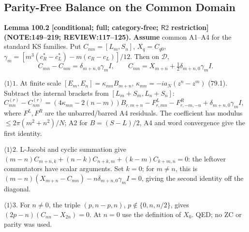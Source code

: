 \subsection{Parity-Free Balance on the Common Domain}

\textbf{Lemma 100.2 [conditional; full; category-free; \(\mathsf R2\) restriction] (NOTE:149--219; REVIEW:117--125).}
\textbf{Assume} common A1--A4 for the standard KS families. Put \(C_{mn}=[L_m,S_n]\), \(X_q=C_{q0}\),
\(\gamma_m=[m^3(c_R^*-c_L^*)-m(c_R-c_L)]/12\). Then on \(\mathcal D\),
\begin{equation}\label{eq:100-mixed}
 C_{mn}-C_{nm}=\delta_{m+n,0}\gamma_m I,\qquad
 C_{mn}=X_{m+n}+\tfrac12\delta_{m+n,0}\gamma_m I. 
\end{equation}
\par\(\langle1\rangle1\). At finite scale \([E_m,E_n]=\kappa_{mn}B_{m+n}\),
\(\kappa_{mn}=-ia_N(z^n-z^m)\) (79.1). Subtract the internal brackets from \([L_m+S_m,L_n+S_n]\):
\(C^{(r)}_{mn}-C^{(r)}_{nm}=(4\kappa_{mn}-2(n-m))B_{r,m+n}-F^L_{r,mn}-F^R_{r,-m,-n}
+\delta_{m+n,0}\gamma_m I\), where \(F^L,F^R\) are the unbarred/barred A4 residuals.
The coefficient has modulus \(\le2\pi(m^2+n^2)/N\); A2 for \(B=(S-L)/2\), A4 and word convergence give the first identity.
\par\(\langle1\rangle2\). L-Jacobi and cyclic summation give
\((m-n)C_{m+n,k}+(n-k)C_{n+k,m}+(k-m)C_{k+m,n}=0\): the leftover commutators have scalar arguments.
Set \(k=0\); for \(m\ne n\), this is
\((m-n)(X_{m+n}-C_{mn})-n\delta_{m+n,0}\gamma_m I=0\), giving the second identity off the diagonal.
\par\(\langle1\rangle3\). For \(n\ne0\), the triple \((p,n-p,n)\), \(p\notin\{0,n,n/2\}\), gives
\((2p-n)(C_{nn}-X_{2n})=0\). At \(n=0\) use the definition of \(X_0\). QED; no ZC or parity was used.

